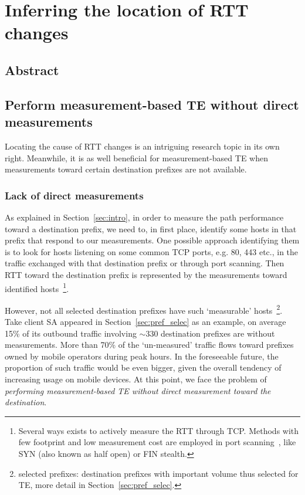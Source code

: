 \chapter{Inferring the location of RTT changes}
\label{sec:infer}
\section*{Abstract}

\section{Perform measurement-based TE without direct measurements}
Locating the cause of RTT changes is an intriguing research topic in its own right.
Meanwhile, it is as well beneficial for measurement-based TE when measurements toward certain destination prefixes are not available.

\subsection{Lack of direct measurements}
As explained in Section~\ref{sec:intro}, in order to measure the path performance toward a destination prefix, we need to, in first place, identify some hosts in that prefix that respond to our measurements.
One possible approach identifying them is to look for hosts listening on some common TCP ports, e.g. 80, 443 etc., in the traffic exchanged with that destination prefix or through port scanning.
Then RTT toward the destination prefix is represented by the measurements toward identified hosts~\footnote{Several ways exists to actively measure the RTT through TCP. Methods with few footprint and low measurement cost are employed in port scanning~\cite{nmap}, like SYN (also known as half open) or FIN stealth.}.

However, not all selected destination prefixes have such `measurable' hosts~\footnote{selected prefixes: destination prefixes with important volume thus selected for TE, more detail in Section~\ref{sec:pref_selec}.}.
Take client SA appeared in Section~\ref{sec:pref_selec} as an example, on average 15\% of its outbound traffic involving $\sim 330$ destination prefixes are without measurements.
More than 70\% of the `un-measured' traffic flows toward prefixes owned by mobile operators during peak hours.
In the foreseeable future, the proportion of such traffic would be even bigger, given the overall tendency of increasing usage on mobile devices.
At this point, we face the problem of \textit{performing measurement-based TE without direct measurement toward the destination}. 

